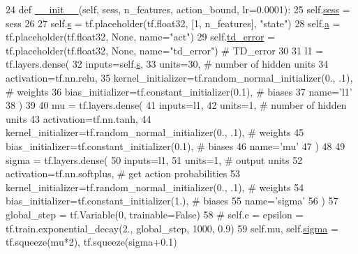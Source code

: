 \begin{DoxyCode}
24     \textcolor{keyword}{def }\hyperlink{classddpg__others_1_1_actor_a98635ab068dfa432844a7007d34f923f}{\_\_init\_\_}(self, sess, n\_features, action\_bound, lr=0.0001):
25         self.\hyperlink{classddpg__others_1_1_actor_af03e8adeb78531e4599419007664842c}{sess} = sess
26 
27         self.\hyperlink{classddpg__others_1_1_actor_aa37c0b7d4b4dcc84ab6dd6295a53ef94}{s} = tf.placeholder(tf.float32, [1, n\_features], \textcolor{stringliteral}{"state"})
28         self.\hyperlink{classddpg__others_1_1_actor_a0f1edbd513cea82df55361aa67ad8794}{a} = tf.placeholder(tf.float32, \textcolor{keywordtype}{None}, name=\textcolor{stringliteral}{"act"})
29         self.\hyperlink{classddpg__others_1_1_actor_a0b3c557a9af387b1f53279af860d2e57}{td\_error} = tf.placeholder(tf.float32, \textcolor{keywordtype}{None}, name=\textcolor{stringliteral}{"td\_error"})  \textcolor{comment}{# TD\_error}
30 
31         l1 = tf.layers.dense(
32             inputs=self.\hyperlink{classddpg__others_1_1_actor_aa37c0b7d4b4dcc84ab6dd6295a53ef94}{s},
33             units=30,  \textcolor{comment}{# number of hidden units}
34             activation=tf.nn.relu,
35             kernel\_initializer=tf.random\_normal\_initializer(0., .1),  \textcolor{comment}{# weights}
36             bias\_initializer=tf.constant\_initializer(0.1),  \textcolor{comment}{# biases}
37             name=\textcolor{stringliteral}{'l1'}
38         )
39 
40         mu = tf.layers.dense(
41             inputs=l1,
42             units=1,  \textcolor{comment}{# number of hidden units}
43             activation=tf.nn.tanh,
44             kernel\_initializer=tf.random\_normal\_initializer(0., .1),  \textcolor{comment}{# weights}
45             bias\_initializer=tf.constant\_initializer(0.1),  \textcolor{comment}{# biases}
46             name=\textcolor{stringliteral}{'mu'}
47         )
48 
49         sigma = tf.layers.dense(
50             inputs=l1,
51             units=1,  \textcolor{comment}{# output units}
52             activation=tf.nn.softplus,  \textcolor{comment}{# get action probabilities}
53             kernel\_initializer=tf.random\_normal\_initializer(0., .1),  \textcolor{comment}{# weights}
54             bias\_initializer=tf.constant\_initializer(1.),  \textcolor{comment}{# biases}
55             name=\textcolor{stringliteral}{'sigma'}
56         )
57         global\_step = tf.Variable(0, trainable=\textcolor{keyword}{False})
58         \textcolor{comment}{# self.e = epsilon = tf.train.exponential\_decay(2., global\_step, 1000, 0.9)}
59         self.mu, self.\hyperlink{classddpg__others_1_1_actor_aed5f0fdc4a7a7ccf996781511f379f29}{sigma} = tf.squeeze(mu*2), tf.squeeze(sigma+0.1)

\end{DoxyCode}
